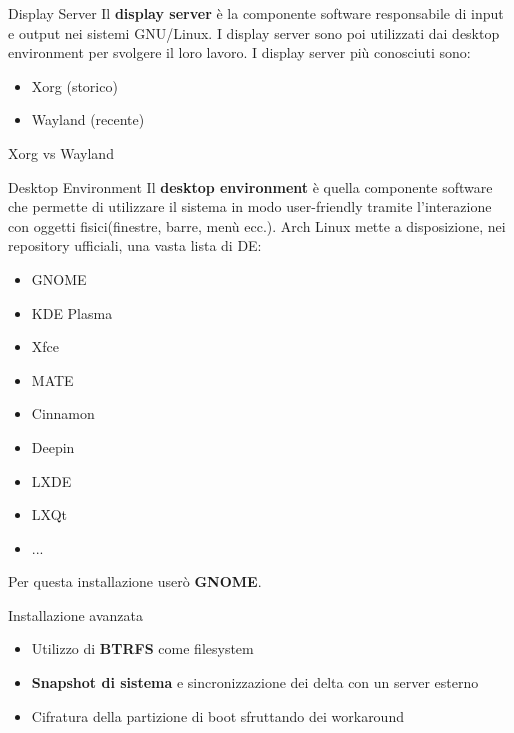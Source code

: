 \begin{frame}{Display Server}
    Il \textbf{display server} è la componente software responsabile di input e output nei sistemi GNU/Linux.
    I display server sono poi utilizzati dai desktop environment per svolgere il loro lavoro.
    I display server più conosciuti sono:
    \begin{itemize}
        \item Xorg (storico)
        \item Wayland (recente)
    \end{itemize}
\end{frame}

\begin{frame}{Xorg vs Wayland}

\end{frame}

\begin{frame}{Desktop Environment}
Il \textbf{desktop environment} è quella componente software che permette di utilizzare il sistema in modo user-friendly
tramite l'interazione con oggetti fisici(finestre, barre, menù ecc.). Arch Linux mette a disposizione, nei repository ufficiali,
una vasta lista di DE:
\begin{itemize}
    \item GNOME
    \item KDE Plasma
    \item Xfce
    \item MATE
    \item Cinnamon
    \item Deepin
    \item LXDE
    \item LXQt
    \item ...
\end{itemize}
Per questa installazione userò \textbf{GNOME}.
\end{frame}

\begin{frame}{Installazione avanzata}
    \begin{itemize}
        \item Utilizzo di \textbf{BTRFS} come filesystem
        \item \textbf{Snapshot di sistema} e sincronizzazione dei delta con un server esterno
        \item Cifratura della partizione di boot sfruttando dei workaround
    \end{itemize}
\end{frame}

